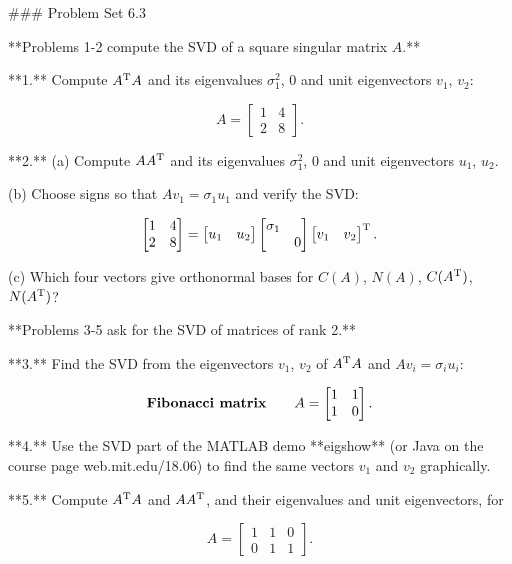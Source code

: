 

### Problem Set 6.3

**Problems 1-2 compute the SVD of a square singular matrix \(A\).**

**1.** Compute \(A^{\rm T}A\) and its eigenvalues \(\sigma_{1}^{2}\), \(0\) and unit eigenvectors \(v_{1}\), \(v_{2}\):

\[A=\begin{bmatrix}1&4\\ 2&8\end{bmatrix}.\]

**2.** (a) Compute \(AA^{\rm T}\) and its eigenvalues \(\sigma_{1}^{2}\), \(0\) and unit eigenvectors \(u_{1}\), \(u_{2}\).

(b) Choose signs so that \(Av_{1}=\sigma_{1}u_{1}\) and verify the SVD:

\[\begin{bmatrix}1&4\\ 2&8\end{bmatrix}=\begin{bmatrix}u_{1}&u_{2}\end{bmatrix}\begin{bmatrix}\sigma _{1}\\ &0\end{bmatrix}\begin{bmatrix}v_{1}&v_{2}\end{bmatrix}^{\rm T}.\]

(c) Which four vectors give orthonormal bases for \(C(A)\), \(N(A)\), \(C(A^{\rm T})\), \(N(A^{\rm T})\)?

**Problems 3-5 ask for the SVD of matrices of rank 2.**

**3.** Find the SVD from the eigenvectors \(v_{1}\), \(v_{2}\) of \(A^{\rm T}A\) and \(Av_{i}=\sigma_{i}u_{i}\):

\[\mbox{\bf Fibonacci matrix}\qquad A=\begin{bmatrix}1&1\\ 1&0\end{bmatrix}.\]

**4.** Use the SVD part of the MATLAB demo **eigshow** (or Java on the course page web.mit.edu/18.06) to find the same vectors \(v_{1}\) and \(v_{2}\) graphically.

**5.** Compute \(A^{\rm T}A\) and \(AA^{\rm T}\), and their eigenvalues and unit eigenvectors, for

\[A=\begin{bmatrix}1&1&0\\ 0&1&1\end{bmatrix}.\]

